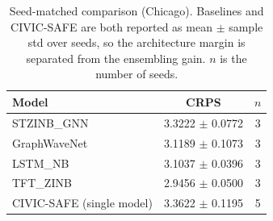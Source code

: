 \begin{table}[t]
\centering
\caption{Seed-matched comparison (Chicago). Baselines and CIVIC-SAFE are both reported as mean $\pm$ sample std over seeds, so the architecture margin is separated from the ensembling gain. $n$ is the number of seeds.}
\label{tab:seed_matched_chicago}
\begin{tabular}{lcc}
\toprule
Model & CRPS & $n$ \\
\midrule
STZINB\_GNN & 3.3222 $\pm$ 0.0772 & 3 \\
GraphWaveNet & 3.1189 $\pm$ 0.1073 & 3 \\
LSTM\_NB & 3.1037 $\pm$ 0.0396 & 3 \\
TFT\_ZINB & 2.9456 $\pm$ 0.0500 & 3 \\
\midrule
CIVIC-SAFE (single model) & 3.3622 $\pm$ 0.1195 & 5 \\
\bottomrule
\end{tabular}
\end{table}
